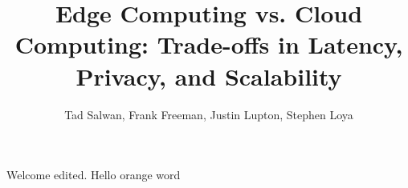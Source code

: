 \documentclass[10pt,a4paper]{article}
\title{Edge Computing vs. Cloud Computing: Trade-offs in Latency, Privacy, and Scalability}
\author{Tad Salwan, Frank Freeman, Justin Lupton, Stephen Loya}
\begin{document}
	\maketitle
	Welcome edited. Hello orange word
\end{document}
